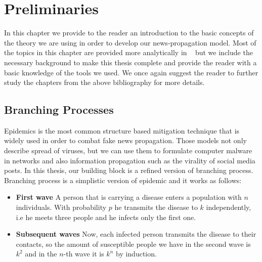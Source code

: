 \chapter{Preliminaries}
\label{ch:Preliminaries}

In this chapter we provide to the reader an introduction to the basic concepts of the theory we are using in order to develop our news-propagation model. Most of the topics in this chapter are provided more analytically in ~\cite{Kleinberg,IntroProbability,koller2009probabilistic,nisan_roughgarden_tardos_vazirani_2007} but we include the necessary background to make this thesis complete and provide the reader with a basic knowledge of the tools we used. We once again suggest the reader to further study the chapters from the above bibliography for more details.


\section{Branching Processes}
\label{sec:BranchingProc}

Epidemics is the most common structure based mitigation technique that is widely used in order to combat fake news propagation. Those models not only describe spread of viruses, but we can use them to formulate computer malware in networks and also information propagation such as the virality of social media posts. In this thesis, our building block is a refined version of branching process. Branching process is a simplistic version of epidemic and it works as follows:

\begin{itemize}
	\item \textbf{First wave} A person that is carrying a disease enters a population with $n$ individuals. With probability $p$ he transmits the disease to $k$ independently, i.e he meets three people and he infects only the first one.
	\item \textbf{Subsequent waves} Now, each infected person transmits the disease to their contacts, so the amount of susceptible people we have in the second wave is $k^2$ and in the $n$-th wave it is $k^n$ by induction. 
\end{itemize}	


